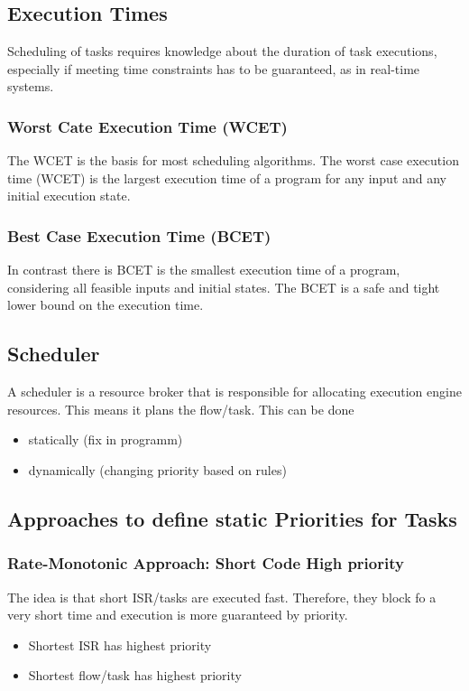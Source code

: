 \subsection{Execution Times}
Scheduling of tasks requires knowledge about the duration of task executions, especially if meeting time constraints has to be guaranteed, as in real-time systems.

\subsubsection[Worst Case Execution Time]{Worst Cate Execution Time (WCET)}
The WCET is the basis for most scheduling algorithms.
The worst case execution time (WCET) is the largest execution time of a program for any input and any initial execution state.

\subsubsection[Best Case Execution Time]{Best Case Execution Time (BCET)}
In contrast there is BCET is the smallest execution time of a program, considering all feasible inputs and initial states.
The BCET is a safe and tight lower bound on the execution time.

\subsection{Scheduler}
A scheduler is a resource broker that is responsible for allocating execution engine resources.
This means it plans the flow/task.
This can be done
\begin{itemize}
  \item statically (fix in programm)
  \item dynamically (changing priority based on rules)
\end{itemize}

\subsection{Approaches to define static Priorities for Tasks}
\subsubsection{Rate-Monotonic Approach: Short Code High priority}
The idea is that short ISR/tasks are executed fast.
Therefore, they block fo a very short time and execution is more guaranteed by priority.
\begin{itemize}
  \item Shortest ISR has highest priority
  \item Shortest flow/task has highest priority
\end{itemize}

